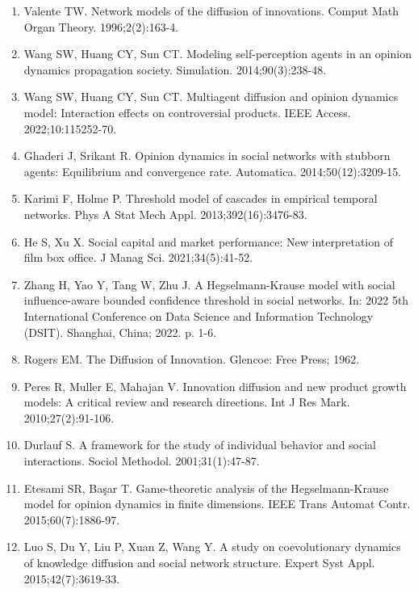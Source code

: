 \documentclass[10pt,letterpaper]{article}
\begin{document}
\begin{enumerate}
\item Valente TW.
Network models of the diffusion of innovations.
Comput Math Organ Theory. 1996;2(2):163-4.

\item Wang SW, Huang CY, Sun CT.
Modeling self-perception agents in an opinion dynamics propagation
  society.
Simulation. 2014;90(3):238-48.

\item Wang SW, Huang CY, Sun CT.
Multiagent diffusion and opinion dynamics model: Interaction effects
  on controversial products.
IEEE Access. 2022;10:115252-70.

\item Ghaderi J, Srikant R.
Opinion dynamics in social networks with stubborn agents: Equilibrium
  and convergence rate.
Automatica. 2014;50(12):3209-15.

\item Karimi F, Holme P.
Threshold model of cascades in empirical temporal networks.
Phys A Stat Mech Appl. 2013;392(16):3476-83.

\item He S, Xu X.
Social capital and market performance: New interpretation of film box
  office.
J Manag Sci. 2021;34(5):41-52.

\item Zhang H, Yao Y, Tang W, Zhu J.
A {H}egselmann-{K}rause model with social influence-aware bounded
  confidence threshold in social networks.
In: 2022 5th International Conference on Data Science and Information
  Technology (DSIT). Shanghai, China; 2022. p. 1-6.

\item Rogers EM.
The Diffusion of Innovation.
Glencoe: Free Press; 1962.

\item Peres R, Muller E, Mahajan V.
Innovation diffusion and new product growth models: A critical review
  and research directions.
Int J Res Mark. 2010;27(2):91-106.

\item Durlauf S.
A framework for the study of individual behavior and social
  interactions.
Sociol Methodol. 2001;31(1):47-87.

\item Etesami SR, Ba{\c{s}}ar T.
Game-theoretic analysis of the {H}egselmann-{K}rause model for
  opinion dynamics in finite dimensions.
IEEE Trans Automat Contr. 2015;60(7):1886-97.

\item Luo S, Du Y, Liu P, Xuan Z, Wang Y.
A study on coevolutionary dynamics of knowledge diffusion and social
  network structure.
Expert Syst Appl. 2015;42(7):3619-33.


\end{enumerate}
\end{document}
